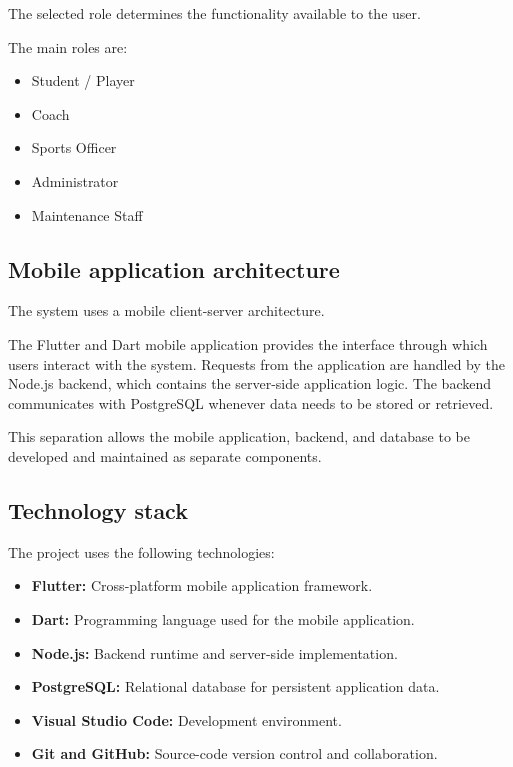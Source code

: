 \documentclass[11pt,a4paper]{article}
\begin{document}
The selected role determines the functionality available to the user.

The main roles are:

\begin{itemize}[leftmargin=0.7cm]

    \item Student / Player
    \item Coach
    \item Sports Officer
    \item Administrator
    \item Maintenance Staff

\end{itemize}

\subsection{Mobile application architecture}

The system uses a mobile client-server architecture.

The Flutter and Dart mobile application provides the interface through
which users interact with the system. Requests from the application are
handled by the Node.js backend, which contains the server-side
application logic. The backend communicates with PostgreSQL whenever
data needs to be stored or retrieved.

This separation allows the mobile application, backend, and database to
be developed and maintained as separate components.

\subsection{Technology stack}

The project uses the following technologies:

\begin{itemize}[leftmargin=0.7cm]

    \item \textbf{Flutter:}
    Cross-platform mobile application framework.

    \item \textbf{Dart:}
    Programming language used for the mobile application.

    \item \textbf{Node.js:}
    Backend runtime and server-side implementation.

    \item \textbf{PostgreSQL:}
    Relational database for persistent application data.

    \item \textbf{Visual Studio Code:}
    Development environment.

    \item \textbf{Git and GitHub:}
    Source-code version control and collaboration.

\end{itemize}
\end{document}
